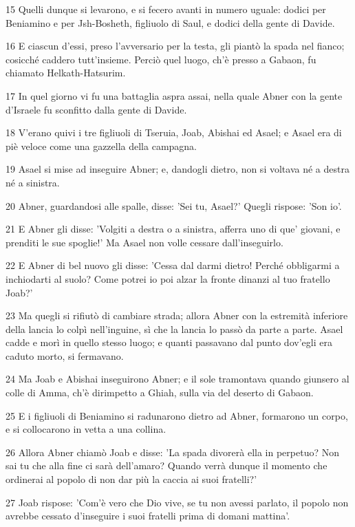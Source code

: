 \par 15 Quelli dunque si levarono, e si fecero avanti in numero uguale: dodici per Beniamino e per Jsh-Bosheth, figliuolo di Saul, e dodici della gente di Davide.
\par 16 E ciascun d'essi, preso l'avversario per la testa, gli piantò la spada nel fianco; cosicché caddero tutt'insieme. Perciò quel luogo, ch'è presso a Gabaon, fu chiamato Helkath-Hatsurim.
\par 17 In quel giorno vi fu una battaglia aspra assai, nella quale Abner con la gente d'Israele fu sconfitto dalla gente di Davide.
\par 18 V'erano quivi i tre figliuoli di Tseruia, Joab, Abishai ed Asael; e Asael era di piè veloce come una gazzella della campagna.
\par 19 Asael si mise ad inseguire Abner; e, dandogli dietro, non si voltava né a destra né a sinistra.
\par 20 Abner, guardandosi alle spalle, disse: 'Sei tu, Asael?' Quegli rispose: 'Son io'.
\par 21 E Abner gli disse: 'Volgiti a destra o a sinistra, afferra uno di que' giovani, e prenditi le sue spoglie!' Ma Asael non volle cessare dall'inseguirlo.
\par 22 E Abner di bel nuovo gli disse: 'Cessa dal darmi dietro! Perché obbligarmi a inchiodarti al suolo? Come potrei io poi alzar la fronte dinanzi al tuo fratello Joab?'
\par 23 Ma quegli si rifiutò di cambiare strada; allora Abner con la estremità inferiore della lancia lo colpì nell'inguine, sì che la lancia lo passò da parte a parte. Asael cadde e morì in quello stesso luogo; e quanti passavano dal punto dov'egli era caduto morto, si fermavano.
\par 24 Ma Joab e Abishai inseguirono Abner; e il sole tramontava quando giunsero al colle di Amma, ch'è dirimpetto a Ghiah, sulla via del deserto di Gabaon.
\par 25 E i figliuoli di Beniamino si radunarono dietro ad Abner, formarono un corpo, e si collocarono in vetta a una collina.
\par 26 Allora Abner chiamò Joab e disse: 'La spada divorerà ella in perpetuo? Non sai tu che alla fine ci sarà dell'amaro? Quando verrà dunque il momento che ordinerai al popolo di non dar più la caccia ai suoi fratelli?'
\par 27 Joab rispose: 'Com'è vero che Dio vive, se tu non avessi parlato, il popolo non avrebbe cessato d'inseguire i suoi fratelli prima di domani mattina'.
